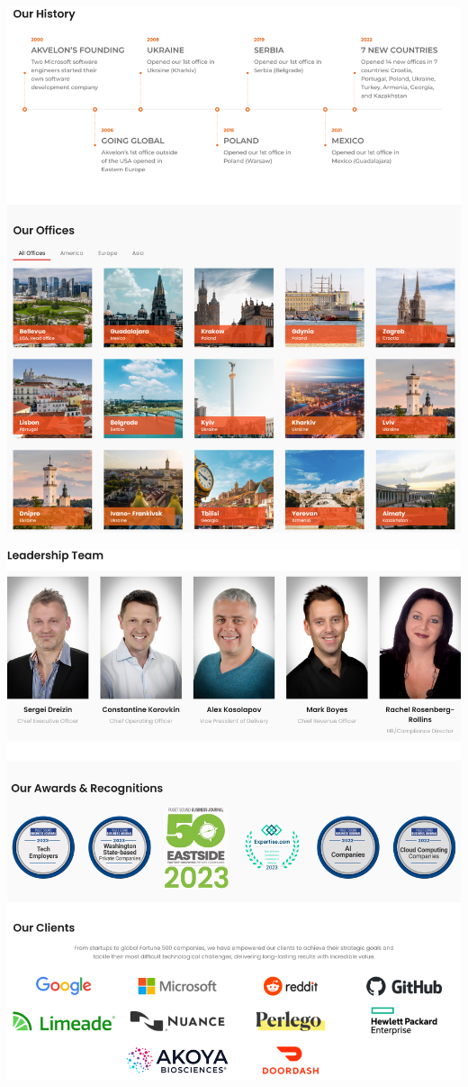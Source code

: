 \Continuing
\begin{center}
    \includegraphics[width=40em]{akvelon-about-p2}
\end{center}
\WillContinue
\pagebreak

\Continuing
\begin{center}
    \includegraphics[width=40em]{akvelon-about-p3}
\end{center}

\pagebreak
